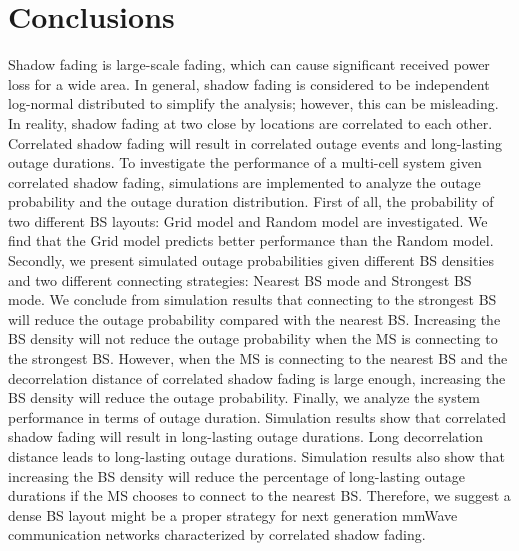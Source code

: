 \documentclass[journal,10pt]{IEEEtran}
\begin{document}
 \section{Conclusions}
 \label{Conclusion}
 Shadow fading is large-scale fading, which can cause significant received power loss for a wide area. In general, shadow fading is considered to be independent log-normal distributed to simplify the analysis; however, this can be misleading. In reality, shadow fading at two close by locations are correlated to each other. Correlated shadow fading will result in correlated outage events and long-lasting outage durations. To investigate the performance of a multi-cell system given correlated shadow fading, simulations are implemented to analyze the outage probability and the outage duration distribution. First of all, the probability of two different BS layouts: Grid model and Random model are investigated. We find that the Grid model predicts better performance than the Random model. Secondly, we present simulated outage probabilities given different BS densities and two different connecting strategies: Nearest BS mode and Strongest BS mode. We conclude from simulation results that connecting to the strongest BS will reduce the outage probability compared with the nearest BS. Increasing the BS density will not reduce the outage probability when the MS is connecting to the strongest BS. However, when the MS is connecting to the nearest BS and the decorrelation distance of correlated shadow fading is large enough, increasing the BS density will reduce the outage probability.  Finally, we analyze the system performance in terms of outage duration. Simulation results show that correlated shadow fading will result in long-lasting outage durations. Long decorrelation distance leads to long-lasting outage durations. Simulation results also show that increasing the BS density will reduce the percentage of long-lasting outage durations if the MS chooses to connect to the nearest BS. Therefore, we suggest a dense BS layout might be a proper strategy for next generation mmWave communication networks characterized by correlated shadow fading.

%
%
%
%
%
%
%
\end{document}
